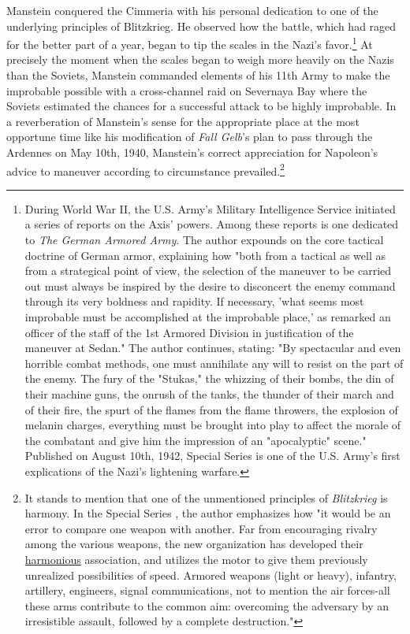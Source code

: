 \documentclass[10pt,a4paper,twoside]{article} %
\begin{document}
\begin{multicols}{2}
{\newline \indent Manstein conquered the Cimmeria with his personal dedication to one of the underlying principles of Blitzkrieg. He observed how the battle, which had raged for the better part of a year, began to tip the scales in the Nazi's favor.\footnote{During World War II, the U.S. Army's Military Intelligence Service initiated a series of reports on the Axis' powers. Among these reports is one dedicated to \emph{The German Armored Army}. The author expounds on the core tactical doctrine of German armor, explaining how "both from a tactical as well as from a strategical point of view, the selection of the maneuver to be carried out must always be inspired by the desire to disconcert the enemy command through its very boldness and rapidity. If necessary, 'what seems most improbable must be accomplished at the improbable place,' as remarked an officer of the staff of the 1st Armored Division in justification of the maneuver at Sedan." The author continues, stating: "By spectacular and even horrible combat methods, one must annihilate any will to resist on the part of the enemy. The fury of the "Stukas," the whizzing of their bombs, the din of their machine guns, the onrush of the tanks, the thunder of their march and of their fire, the spurt of the flames from the flame throwers, the explosion of melanin charges, everything must be brought into play to affect the morale of the combatant and give him the impression of an "apocalyptic" scene." Published on August 10th, 1942, Special Series  is one of the U.S. Army's first explications of the Nazi's lightening warfare.} At precisely the moment when the scales began to weigh more heavily on the Nazis than the Soviets, Manstein commanded elements of his 11th Army to make the improbable possible with a cross-channel raid on Severnaya Bay where the Soviets estimated the chances for a successful attack to be highly improbable. In a reverberation of Manstein's sense for the appropriate place at the most opportune time like his modification of \emph{Fall Gelb}'s plan to pass through the Ardennes on May 10th, 1940, Manstein's correct appreciation for Napoleon's advice to maneuver according to circumstance prevailed.\footnote{It stands to mention that one of the unmentioned principles of \emph{Blitzkrieg} is harmony. In the Special Series , the author emphasizes how "it would be an error to compare one weapon with another. Far from encouraging rivalry among the various weapons, the new organization has developed their \underline{harmonious} association, and utilizes the motor to give them previously unrealized possibilities of speed. Armored weapons (light or heavy), infantry, artillery, engineers, signal communications, not to mention the air forces-all these arms contribute to the common aim: overcoming the adversary by an irresistible assault, followed by a complete destruction."}
}

\end{multicols}
\end{document}
